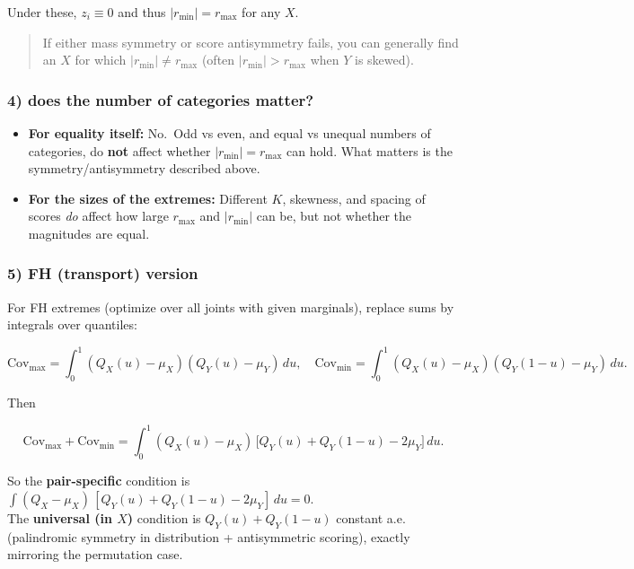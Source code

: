 \documentclass[
  letterpaper,
  DIV=11,
  numbers=noendperiod]{scrartcl}
\theoremstyle{remark}
\begin{document}
Under these, \(z_i\equiv 0\) and thus \(|r_{\min}|=r_{\max}\) for any
\(X\).

\begin{quote}
If either mass symmetry or score antisymmetry fails, you can generally
find an \(X\) for which \(|r_{\min}|\ne r_{\max}\) (often
\(|r_{\min}|>r_{\max}\) when \(Y\) is skewed).
\end{quote}

\subsubsection{\texorpdfstring{4) does the \textbf{number of categories}
matter?}{4) does the number of categories matter?}}\label{does-the-number-of-categories-matter}

\begin{itemize}
\item
  \textbf{For equality itself:} No.~Odd vs even, and equal vs unequal
  numbers of categories, do \textbf{not} affect whether
  \(|r_{\min}|=r_{\max}\) can hold. What matters is the
  symmetry/antisymmetry described above.
\item
  \textbf{For the sizes of the extremes:} Different \(K\), skewness, and
  spacing of scores \emph{do} affect how large \(r_{\max}\) and
  \(|r_{\min}|\) can be, but not whether the magnitudes are equal.
\end{itemize}

\subsubsection{5) FH (transport) version}\label{fh-transport-version}

For FH extremes (optimize over all joints with given marginals), replace
sums by integrals over quantiles:

\[\mathrm{Cov}_{\max}=\int_0^1 (Q_X(u)-\mu_X)(Q_Y(u)-\mu_Y)\,du,\quad  
\mathrm{Cov}_{\min}=\int_0^1 (Q_X(u)-\mu_X)(Q_Y(1-u)-\mu_Y)\,du.\]

Then

\[\mathrm{Cov}_{\max}+\mathrm{Cov}_{\min}=\int_0^1 (Q_X(u)-\mu_X)\,\bigl[Q_Y(u)+Q_Y(1-u)-2\mu_Y\bigr]\,du.\]

So the \textbf{pair-specific} condition is
\(\int (Q_X-\mu_X)\,[Q_Y(u)+Q_Y(1-u)-2\mu_Y]\,du=0\).\\
The \textbf{universal (in \(X\))} condition is \(Q_Y(u)+Q_Y(1-u)\)
constant a.e. (palindromic symmetry in distribution + antisymmetric
scoring), exactly mirroring the permutation case.
\end{document}

